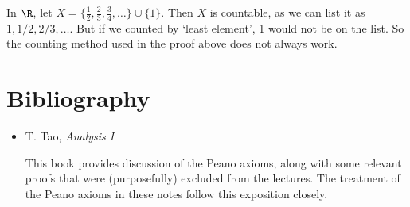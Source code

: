 \documentclass[a4paper]{scrreprt}
\begin{document}
\begin{remark}[A Warning]
	In $\R$, let $X = \{\frac{1}{2}, \frac{2}{3}, \frac{3}{4}, \dots \} \cup \{1\}$. Then $X$ is countable, as we can list it as $1, 1/2, 2/3, \dots$. But if we counted by `least element', 1 would not be on the list. So the counting method used in the proof above does not always work.
\end{remark}


\clearpage
\chapter*{Bibliography}

\begin{itemize}
	\item T. Tao, \emph{Analysis I}
	
	This book provides discussion of the Peano axioms, along with some relevant proofs that were (purposefully) excluded from the lectures. The treatment of the Peano axioms in these notes follow this exposition closely.
\end{itemize}




\end{document}
